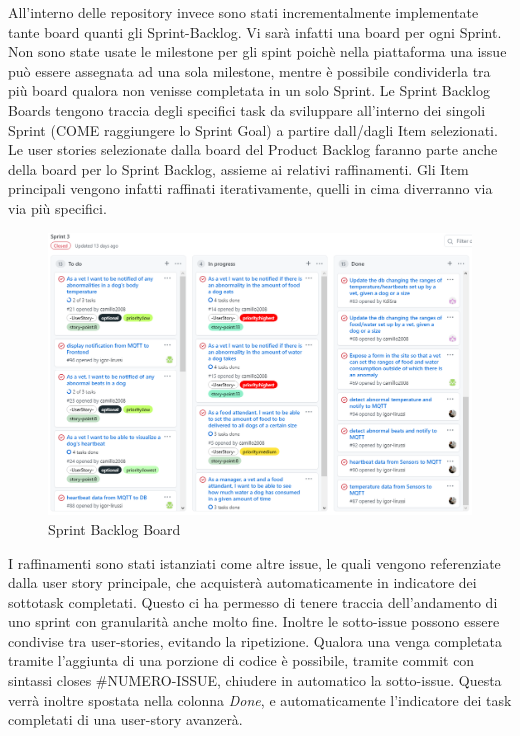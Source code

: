     All'interno delle repository invece sono stati incrementalmente implementate tante board quanti gli Sprint-Backlog. Vi sarà infatti una board per ogni Sprint. Non sono state usate le milestone per gli spint poichè nella piattaforma una issue può essere assegnata ad una sola milestone, mentre è possibile condividerla tra più board qualora non venisse completata in un solo Sprint.
    Le Sprint Backlog Boards tengono traccia degli specifici task da sviluppare all'interno dei singoli Sprint (COME raggiungere lo Sprint Goal) a partire dall/dagli Item selezionati. Le user stories selezionate dalla board del Product Backlog faranno parte anche della board per lo Sprint Backlog, assieme ai relativi raffinamenti. Gli Item principali vengono infatti raffinati iterativamente, quelli in cima diverranno via via più specifici.
    \begin{figure}[H]
        \caption{Sprint Backlog Board}
        \centering
       \includegraphics[width=1\textwidth]{Images/sprintBacklogBoard.png}
    \end{figure}
    I raffinamenti sono stati istanziati come altre issue, le quali vengono referenziate dalla user story principale, che acquisterà automaticamente in indicatore dei sottotask completati. Questo ci ha permesso di tenere traccia dell'andamento di uno sprint con granularità anche molto fine. Inoltre le sotto-issue possono essere condivise tra user-stories, evitando la ripetizione. Qualora una venga completata tramite l'aggiunta di una porzione di codice è possibile, tramite commit con sintassi closes \#NUMERO-ISSUE, chiudere in automatico la sotto-issue. Questa verrà inoltre spostata nella colonna \textit{Done}, e automaticamente l'indicatore dei task completati di una user-story avanzerà.
